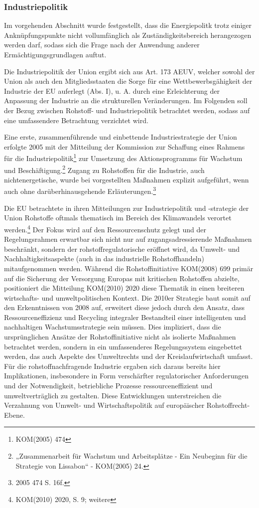 \documentclass[12pt,a4paper,oneside]{book} %
\begin{document}
\subsubsection{Industriepolitik}
Im vorgehenden Abschnitt wurde festgestellt, dass die Energiepolitk trotz einiger Anknüpfungspunkte nicht vollumfänglich als Zuständigkeitsbereich herangezogen werden darf, sodass sich die Frage nach der Anwendung anderer Ermächtigungsgrundlagen auftut.
	
Die Industriepolitik der Union ergibt sich aus Art. 173 AEUV, welcher sowohl der Union als auch den Mitgliedsstaaten die Sorge für eine Wettbewerbsgähigkeit der Industrie der EU auferlegt (Abs. I), u. A. durch eine \glqq Erleichterung der Anpassung der Industrie an die strukturellen Veränderungen\grqq. Im Folgenden soll der Bezug zwischen Rohstoff- und Industriepolitik betrachtet werden, sodass auf eine umfassendere Betrachtung verzichtet wird.

Eine erste, zusammenführende und einbettende Industriestrategie der Union  erfolgte 2005 mit der Mitteilung der Kommission zur Schaffung eines Rahmens für die Industriepolitik\footnote{KOM(2005) 474} zur Umsetzung des Aktionsprogramms für Wachstum und Beschäftigung.\footnote{„Zusammenarbeit für Wachstum und Arbeitsplätze - Ein Neubeginn für die Strategie von Lissabon“ - KOM(2005) 24.} Zugang zu Rohstoffen für die Industrie, auch nichtenergetische, wurde bei vorgestellten Maßnahmen explizit aufgeführt, wenn auch ohne darüberhinausgehende Erläuterungen.\footnote{2005 474 S. 16f.}
	
Die EU betrachtete in ihren Mitteilungen zur Industriepolitik und -strategie der Union Rohstoffe oftmals thematisch im Bereich des Klimawandels verortet werden.\footnote{KOM(2010) 2020, S. 9; weitere} Der Fokus wird auf den Ressourcenschutz gelegt und der Regelungsrahmen erwartbar sich nicht nur auf zugangsadressierende Maßnahmen beschränkt, sondern der rohstoffregulatorische eröffnet wird, da Umwelt- und Nachhaltigkeitsaspekte (auch in das industrielle Rohstoffhandeln) mitaufgenommen werden. Während die Rohstoffinitiative KOM(2008) 699 primär auf die Sicherung der Versorgung Europas mit kritischen Rohstoffen abzielte, positioniert die Mitteilung KOM(2010) 2020 diese Thematik in einen breiteren wirtschafts- und umweltpolitischen Kontext. Die 2010er Strategie baut somit auf den Erkenntnissen von 2008 auf, erweitert diese jedoch durch den Ansatz, dass Ressourceneffizienz und Recycling integraler Bestandteil einer intelligenten und nachhaltigen Wachstumsstrategie sein müssen. Dies impliziert, dass die ursprünglichen Ansätze der Rohstoffinitiative nicht als isolierte Maßnahmen betrachtet werden, sondern in ein umfassenderes Regelungssystem eingebettet werden, das auch Aspekte des Umweltrechts und der Kreislaufwirtschaft umfasst. Für die rohstoffnachfragende Industrie ergaben sich daraus bereits hier Implikationen, insbesondere in Form verschärfter regulatorischer Anforderungen und der Notwendigkeit, betriebliche Prozesse ressourceneffizient und umweltverträglich zu gestalten. Diese Entwicklungen unterstreichen die Verzahnung von Umwelt- und Wirtschaftspolitik auf europäischer Rohstoffrecht-Ebene.
\end{document}
